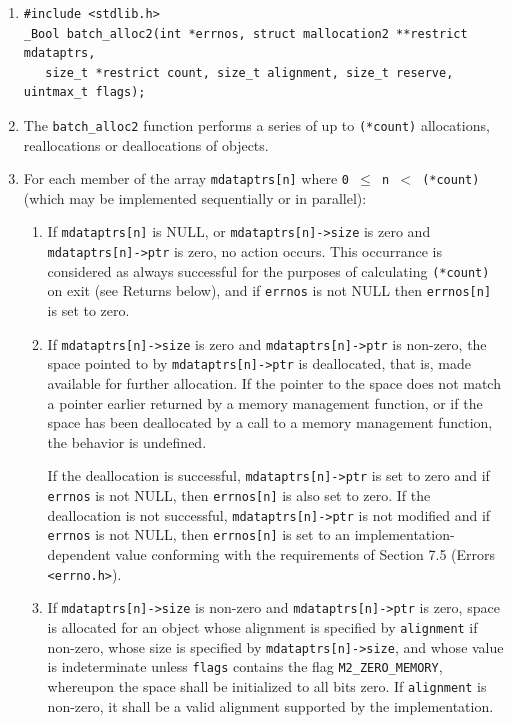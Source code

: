 \documentclass[wd]{isov2}
\begin{document}
{
\begin{enumerate}
\renewcommand{\theenumi}{\arabic{enumi}}
\item \begin{verbatim}
#include <stdlib.h>
_Bool batch_alloc2(int *errnos, struct mallocation2 **restrict mdataptrs,
   size_t *restrict count, size_t alignment, size_t reserve, uintmax_t flags);
\end{verbatim}
\item The \texttt{batch\_alloc2} function performs a series of up to \texttt{(*count)} allocations, reallocations or deallocations of objects.
\item For each member of the array \texttt{mdataptrs[n]} where \texttt{0 $\le$ n $<$ (*count)} (which may be implemented sequentially or in parallel):
\begin{enumerate}
\renewcommand{\theenumii}{\alph{enumii}}
\item If \texttt{mdataptrs[n]} is NULL, or \texttt{mdataptrs[n]->size} is zero and \texttt{mdataptrs[n]->ptr} is zero, no action occurs. This occurrance is considered as always successful for the purposes of calculating \texttt{(*count)} on exit (see Returns below), and if \texttt{errnos} is not NULL then \texttt{errnos[n]} is set to zero.

\item If \texttt{mdataptrs[n]->size} is zero and \texttt{mdataptrs[n]->ptr} is non-zero, the space pointed to by \texttt{mdataptrs[n]->ptr} is deallocated, that is, made available for further allocation. If the pointer to the space does not match a pointer earlier returned by a memory management function, or if the space has been deallocated by a call to a memory management function, the behavior is undefined.

If the deallocation is successful, \texttt{mdataptrs[n]->ptr} is set to zero and if \texttt{errnos} is not NULL, then \texttt{errnos[n]} is also set to zero. If the deallocation is not successful, \texttt{mdataptrs[n]->ptr} is not modified and if \texttt{errnos} is not NULL, then \texttt{errnos[n]} is set to an implementation-dependent value conforming with the requirements of Section 7.5 (Errors \texttt{<errno.h>}).

\item If \texttt{mdataptrs[n]->size} is non-zero and \texttt{mdataptrs[n]->ptr} is zero, space is allocated for an object whose alignment is specified by \texttt{alignment} if non-zero, whose size is specified by \texttt{mdataptrs[n]->size}, and whose value is indeterminate unless \texttt{flags} contains the flag \texttt{M2\_ZERO\_MEMORY}, whereupon the space shall be initialized to all bits zero. If \texttt{alignment} is non-zero, it shall be a valid alignment supported by the implementation.


\end{enumerate}
\end{enumerate}}
\end{document}
